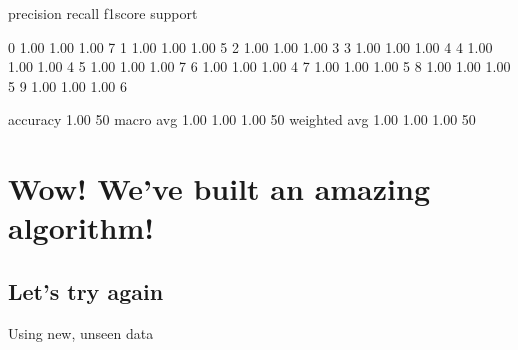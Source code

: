\documentclass[letterpaper,10pt,english]{sphinxmanual}
\begin{document}
\begin{sphinxVerbatim}[commandchars=\\\{\}]
              precision    recall  f1\PYGZhy{}score   support

           0       1.00      1.00      1.00         7
           1       1.00      1.00      1.00         5
           2       1.00      1.00      1.00         3
           3       1.00      1.00      1.00         4
           4       1.00      1.00      1.00         4
           5       1.00      1.00      1.00         7
           6       1.00      1.00      1.00         4
           7       1.00      1.00      1.00         5
           8       1.00      1.00      1.00         5
           9       1.00      1.00      1.00         6

    accuracy                           1.00        50
   macro avg       1.00      1.00      1.00        50
weighted avg       1.00      1.00      1.00        50
\end{sphinxVerbatim}


\section{Wow! We’ve built an amazing algorithm!}
\label{\detokenize{05-SupervisedSegmentation:wow-we-ve-built-an-amazing-algorithm}}


\sphinxAtStartPar
{}


\subsection{Let’s try again}
\label{\detokenize{05-SupervisedSegmentation:let-s-try-again}}
\sphinxAtStartPar
Using new, unseen data
\end{document}
